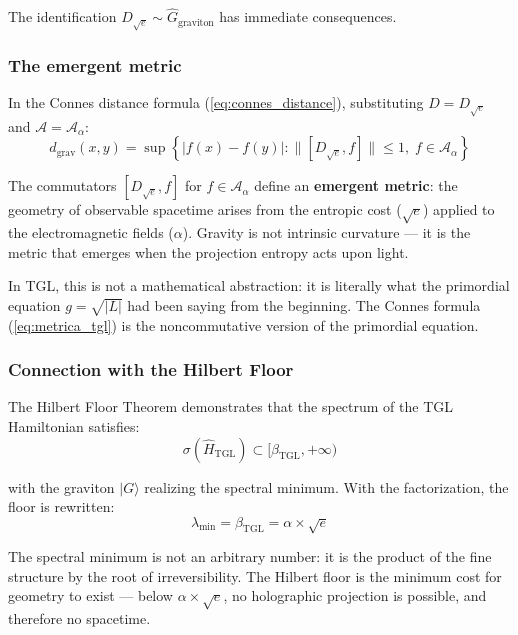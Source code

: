 \documentclass[12pt,a4paper,twoside]{article}
\newcommand{\betatgl}{\beta_{\!\scriptscriptstyle\mathrm{TGL}}}
\begin{document}
The identification $D_{\sqrt{e}} \sim \hat{G}_{\text{graviton}}$ has immediate consequences.

\subsubsection{The emergent metric}

In the Connes distance formula (\ref{eq:connes_distance}), substituting $D = D_{\sqrt{e}}$ and $\mathcal{A} = \mathcal{A}_\alpha$:
\begin{equation}
d_{\text{grav}}(x,y) = \sup\left\{|f(x) - f(y)| : \|[D_{\sqrt{e}}, f]\| \leq 1,\; f \in \mathcal{A}_\alpha\right\}
\label{eq:metrica_tgl}
\end{equation}

The commutators $[D_{\sqrt{e}}, f]$ for $f \in \mathcal{A}_\alpha$ define an \textbf{emergent metric}: the geometry of observable spacetime arises from the entropic cost ($\sqrt{e}$) applied to the electromagnetic fields ($\alpha$). Gravity is not intrinsic curvature --- it is the metric that emerges when the projection entropy acts upon light.

In TGL, this is not a mathematical abstraction: it is literally what the primordial equation $g = \sqrt{|L|}$ had been saying from the beginning. The Connes formula (\ref{eq:metrica_tgl}) is the noncommutative version of the primordial equation.

\subsubsection{Connection with the Hilbert Floor}

The Hilbert Floor Theorem \cite{Miguel2026Graviton} demonstrates that the spectrum of the TGL Hamiltonian satisfies:
\begin{equation}
\sigma(\hat{H}_{\text{TGL}}) \subset [\betatgl, +\infty)
\end{equation}

\noindent with the graviton $|G\rangle$ realizing the spectral minimum. With the factorization, the floor is rewritten:
\begin{equation}
\lambda_{\min} = \betatgl = \alpha \times \sqrt{e}
\end{equation}

The spectral minimum is not an arbitrary number: it is the product of the fine structure by the root of irreversibility. The Hilbert floor is the minimum cost for geometry to exist --- below $\alpha \times \sqrt{e}$, no holographic projection is possible, and therefore no spacetime.
\end{document}
